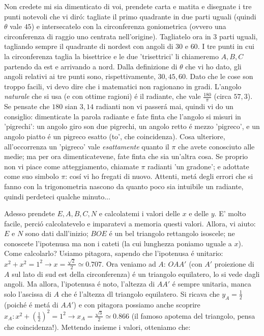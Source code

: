 Non credete mi sia dimenticato di voi, prendete carta e matita e disegnate i tre punti notevoli che vi dir\'o: tagliate il primo quadrante
in due parti uguali (quindi $\theta$ vale $45$) e intersecatelo con la circonferenza goniometrica (ovvero una circonferenza di raggio uno centrata nell'origine).
Tagliatelo ora in 3 parti uguali, tagliando sempre il quadrante di nordest con angoli di $30$ e $60$. I tre punti in cui la circonferenza taglia la bisettrice
e le due 'trisettrici' li chiameremo $A,B,C$ partendo da est e arrivando a nord. Dalla definizione di $\theta$ che vi ho dato, gli angoli relativi ai tre punti
sono, rispettivamente, $30,45,60$. Dato che le cose son troppo facili, vi devo dire che i matematici non ragionano in gradi. L'angolo {\em naturale} che
si usa (e con ottime ragioni) \'e il radiante, che vale $\frac{180}{\pi}$ (circa $57,3$). Se pensate che $180$ sian $3,14$ radianti non vi passer\'a mai,
quindi vi do un consiglio: dimenticate la parola radiante e fate finta che l'angolo si misuri in 'pigrechi': un angolo giro son due pigrechi, un angolo retto
\'e mezzo 'pigreco', e un angolo piatto \'e un pigreco esatto (to', che coincidenza). Cosa ulteriore, all'occorrenza un 'pigreco' vale {\em esattamente}
quanto il $\pi$ che avete conosciuto alle medie; ma per ora dimenticatevene, fate finta che sia un'altra cosa. Se proprio non vi piace come atteggiamento,
chiamate $\pi$ radianti 'un gradone'; e adottate come suo simbolo $\pi$: cos\'i vi ho fregati di nuovo. Attenti, met\'a degli errori che si fanno con
la trigonometria nascono da quanto poco sia intuibile un radiante, quindi perdeteci qualche minuto...

Adesso prendete $E,A,B,C,N$ e calcolatemi i valori delle $x$ e delle $y$. E' molto facile, perci\'o calcolatevelo e imparatevi a memoria questi valori.
Allora, vi aiuto: $E$ e $N$ sono dati dall'inizio; $BOE$ \'e un bel triangolo rettangolo isoscele; ne conoscete l'ipotenusa ma non i cateti (la cui
lunghezza poniamo uguale a $x$). Come calcolarlo? Usiamo pitagora, sapendo che l'ipotenusa \'e unitario: 
$x^2+x^2=1^2 \longrightarrow x=\frac{\sqrt{2}}{2}\simeq 0.707$. Ora veniamo ad $A$: $OAA'$ (con $A'$ proiezione di $A$ sul lato di sud est
della circonferenza) \'e un triangolo equilatero, lo si vede dagli angoli. Ma allora, l'ipotenusa \'e noto, l'altezza di $AA'$ \'e sempre unitaria,
manca solo l'ascissa di $A$ che \'e l'altezza dl triangolo equilatero. Si ricava che $y_A=\frac{1}{2}$ (poich\'e \'e met\'a di $AA'$) e con pitagora
possiamo anche scoprire $x_A: x^2+(\frac{1}{2})^2=1^2 \longrightarrow x_A=\frac{\sqrt{3}}{2} \simeq 0.866$ (il famoso apotema del triangolo, pensa che
coincidenza!). Mettendo insieme i valori, otteniamo che:

